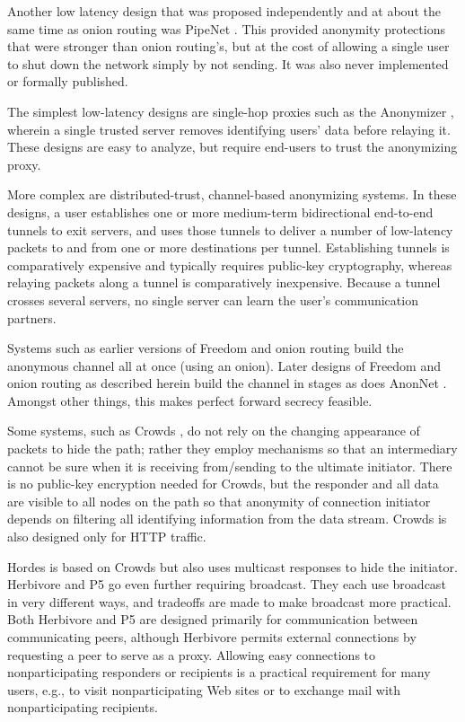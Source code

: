 \documentclass[times,10pt,twocolumn]{article}
\begin{document}
Another low latency design that was proposed independently and at
about the same time as onion routing was PipeNet \cite{pipenet}.
This provided anonymity protections that were stronger than onion routing's,
but at the cost of allowing a single user to shut down the network simply
by not sending. It was also never implemented or formally published.

The simplest low-latency designs are single-hop proxies such as the
Anonymizer \cite{anonymizer}, wherein a single trusted server removes
identifying users' data before relaying it.  These designs are easy to
analyze, but require end-users to trust the anonymizing proxy.

More complex are distributed-trust, channel-based anonymizing systems.  In
these designs, a user establishes one or more medium-term bidirectional
end-to-end tunnels to exit servers, and uses those tunnels to deliver a
number of low-latency packets to and from one or more destinations per
tunnel.  Establishing tunnels is comparatively expensive and typically
requires public-key cryptography, whereas relaying packets along a tunnel is
comparatively inexpensive.  Because a tunnel crosses several servers, no
single server can learn the user's communication partners.

Systems such as earlier versions of Freedom and onion routing
build the anonymous channel all at once (using an onion). Later
designs of Freedom and onion routing as described herein build
the channel in stages as does AnonNet
\cite{anonnet}. Amongst other things, this makes perfect forward
secrecy feasible.

Some systems, such as Crowds \cite{crowds-tissec}, do not rely on the
changing appearance of packets to hide the path; rather they employ
mechanisms so that an intermediary cannot be sure when it is
receiving from/sending to the ultimate initiator. There is no public-key
encryption needed for Crowds, but the responder and all data are
visible to all nodes on the path so that anonymity of connection
initiator depends on filtering all identifying information from the
data stream. Crowds is also designed only for HTTP traffic.

Hordes \cite{hordes-jcs} is based on Crowds but also uses multicast
responses to hide the initiator. Herbivore \cite{herbivore} and
P5 \cite{p5} go even further requiring broadcast.
They each use broadcast in very different ways, and tradeoffs are made to
make broadcast more practical. Both Herbivore and P5 are designed primarily
for communication between communicating peers, although Herbivore
permits external connections by requesting a peer to serve as a proxy.
Allowing easy connections to nonparticipating responders or recipients
is a practical requirement for many users, e.g., to visit
nonparticipating Web sites or to exchange mail with nonparticipating
recipients.
\end{document}
